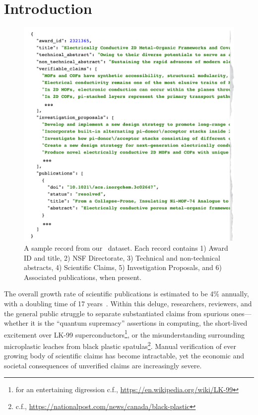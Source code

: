 \documentclass[11pt]{article}
\begin{document}
\section{Introduction}
\begin{figure}[h]
    \centering
    \includegraphics[width=1\linewidth]{images/nsf-scify-sample-record.png}
    \caption{A sample record from our \DatasetName~dataset. Each record contains 1) Award ID and title, 2) NSF Directorate, 3) Technical and non-technical abstracts, 4) Scientific Claims, 5) Investigation Proposals, and 6) Associated publications, when present.}
    \label{fig:sample-record}
\end{figure}
The overall growth rate of scientific publications is estimated to be 4\% annually, with a doubling time of 17 years~\cite{Bornmann2021}. Within this deluge, researchers, reviewers, and the general public struggle to separate substantiated claims from spurious ones—whether it is the ``quantum supremacy'' assertions in computing, the short-lived excitement over LK-99 superconductors\footnote[3]{for an entertaining digression c.f., \url{https://en.wikipedia.org/wiki/LK-99}}, or the misunderstanding surrounding microplastic leaches from black plastic spatulas\footnote[4]{c.f., \url{https://nationalpost.com/news/canada/black-plastic}}. Manual verification of ever growing body of scientific claims has become intractable, yet the economic and societal consequences of unverified  claims are increasingly severe. 
\end{document}
